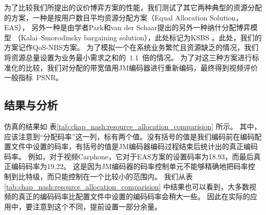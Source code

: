 为了比较我们所提出的议价博弈方案的性能，我们测试了其它两种典型的资源分配的方案，一种是按用户数目平均资源分配方案（Equal Allocation Solution，EAS），
另外一种是由学者Park和van der Schaar提出的另外一种纳什分配博弈模型 （Kalai–Smorodinsky  bargaining  solution），此处标记为KSBS \cite{ParkVanderSchaar2007}。此处，我们的方案记作QoS-NBS方案。
为了模拟一个在系统业务繁忙且资源缺乏的情况，我们将资源总量设置为业务最小需求之和的~$1.1$~倍的情况。
为了对这三种方案进行标准化的比较，我们对分配的带宽值用JM编码器进行重新编码，最终得到视频评价一般指标~PSNR。

\subsection{结果与分析}
仿真的结果如 表\ref{tab:chap_nash:resource_allocation_comparision} 所示。
其中，应该注意到“分配码率”这一列，标有两个值。没有括号的值是我们编码前在编码配置文件中设置的码率，有括号的值是JM编码器编码过程结束后统计出的真正编码码率。
例如，对于视频Carphone，它对于EAS方案的设置码率为18.93，而最后真正编码码率为19.22。
这是因为JM编码器的码率控制单元不能够精确地把码率控制到比特级，而只能控制在一个比较小的范围内。
我们从表\ref{tab:chap_nash:resource_allocation_comparision} 中结果也可以看到，大多数视频的真正的编码码率比配置文件中设置的编码码率会稍大一些。
因此在实际的应用中，要注意到这个不同，提前设置一部分余量。

